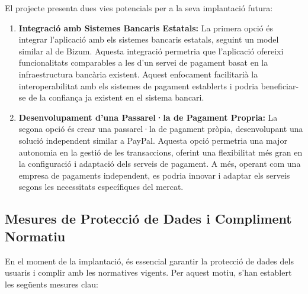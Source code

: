\documentclass[a4paper,12pt,twoside]{ThesisStyle}
\begin{document}
El projecte presenta dues vies potencials per a la seva implantació futura:

\begin{enumerate}
    \item \textbf{Integració amb Sistemes Bancaris Estatals:} La primera opció és integrar l'aplicació amb els sistemes bancaris estatals, seguint un model similar al de Bizum. Aquesta integració permetria que l'aplicació ofereixi funcionalitats comparables a les d'un servei de pagament basat en la infraestructura bancària existent. Aquest enfocament facilitarià la interoperabilitat amb els sistemes de pagament establerts i podria beneficiar-se de la confiança ja existent en el sistema bancari.

    \item \textbf{Desenvolupament d'una Passarel·la de Pagament Propria:} La segona opció és crear una passarel·la de pagament pròpia, desenvolupant una solució independent similar a PayPal. Aquesta opció permetria una major autonomia en la gestió de les transaccions, oferint una flexibilitat més gran en la configuració i adaptació dels serveis de pagament. A més, operant com una empresa de pagaments independent, es podria innovar i adaptar els serveis segons les necessitats específiques del mercat.
\end{enumerate}

\subsection{Mesures de Protecció de Dades i Compliment Normatiu}

En el moment de la implantació, és essencial garantir la protecció de dades dels usuaris i complir amb les normatives vigents. Per aquest motiu, s'han establert les següents mesures clau:
\end{document}
